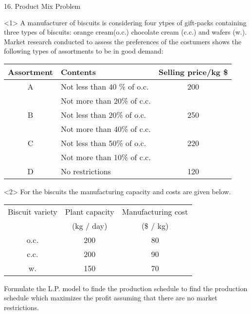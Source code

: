 \begin{frameExample}{16. Product Mix Problem}{}
  \begin{onlyenv}<1>
      A manufacturer of biscuits is considering four ytpes of gift-packs containing three types of biscuits: orange cream(o.c.) chocolate cream (c.c.) and wafers (w.). Market research conducted to assess the preferences of the costumers shows the following types of assortments to be in good demand:

  {
    \centering
    \begin{tabular}{clc}
      \toprule
      Assortment    & Contents&	Selling price/kg \$\\
      \midrule
A&	Not less than 40 \% of o.c.&	200\\
&	Not more than 20\% of c.c.&	\\
B&	Not less than 20\% of o.c.&	250\\
&	Not more than 40\% of c.c.&	\\
C&	Not less than 50\% of o.c.&	220\\
&	Not more than 10\% of c.c.&	\\
      D&	No restrictions	&120\\
      \bottomrule
    \end{tabular}
    \par
  }
\end{onlyenv}

\begin{onlyenv}<2>
  For the biscuits the manufacturing capacity and costs are given below.
  
  {
    \centering
    \begin{tabular}{ccc}
      \toprule
      Biscuit variety&	Plant capacity&	Manufacturing cost\\
                     &(kg / day)&	(\$ / kg)\\
      \midrule
      o.c.&	200&	80\\
      c.c.	&200&	90\\
      w.	&150&	70\\
      \toprule
    \end{tabular}
    \par
  }

  Formulate the L.P. model to finde the production schedule to find the production schedule which maximizes the profit assuming that there are no market restrictions.
\end{onlyenv}
\end{frameExample}


